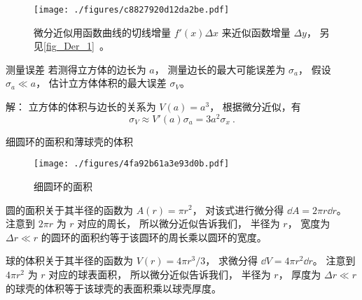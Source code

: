 \begin{figure}[ht]
\centering
\texttt{[image: ./figures/c8827920d12da2be.pdf]}
\caption{微分近似用函数曲线的切线增量 $f'(x)\Delta x$ 来近似函数增量 $\Delta y$， 另见\autoref{fig_Der_1}~。} \label{fig_Diff_1}
\end{figure}

\begin{example}{测量误差}\label{ex_Diff_1}
若测得立方体的边长为 $a$， 测量边长的最大可能误差为 $\sigma_a$， 假设 $\sigma_a \ll a$， 估计立方体体积的最大误差 $\sigma_V$。

解： 立方体的体积与边长的关系为 $V(a)=a^3$， 根据微分近似，有
\begin{equation}
\sigma_V \approx V'(a) \sigma_a = 3a^2 \sigma_x~.
\end{equation}
\end{example}

\begin{example}{细圆环的面积和薄球壳的体积}\label{ex_Diff_2}
\begin{figure}[ht]
\centering
\texttt{[image: ./figures/4fa92b61a3e93d0b.pdf]}
\caption{细圆环的面积} \label{fig_Diff_2}
\end{figure}
圆的面积关于其半径的函数为 $A(r) = \pi r^2$， 对该式进行微分得 $\dd{A} = 2\pi r\dd{r}$。 注意到 $2\pi r$ 为 $r$ 对应的周长， 所以微分近似告诉我们， 半径为 $r$， 宽度为 $\Delta r \ll r$ 的圆环的面积约等于该圆环的周长乘以圆环的宽度。

球的体积关于其半径的函数为 $V(r) = 4\pi r^3/3$， 求微分得 $\dd{V} = 4\pi r^2 \dd{r}$。 注意到 $4\pi r^2$ 为 $r$ 对应的球表面积， 所以微分近似告诉我们， 半径为 $r$， 厚度为 $\Delta r \ll r$ 的球壳的体积等于该球壳的表面积乘以球壳厚度。
\end{example}
